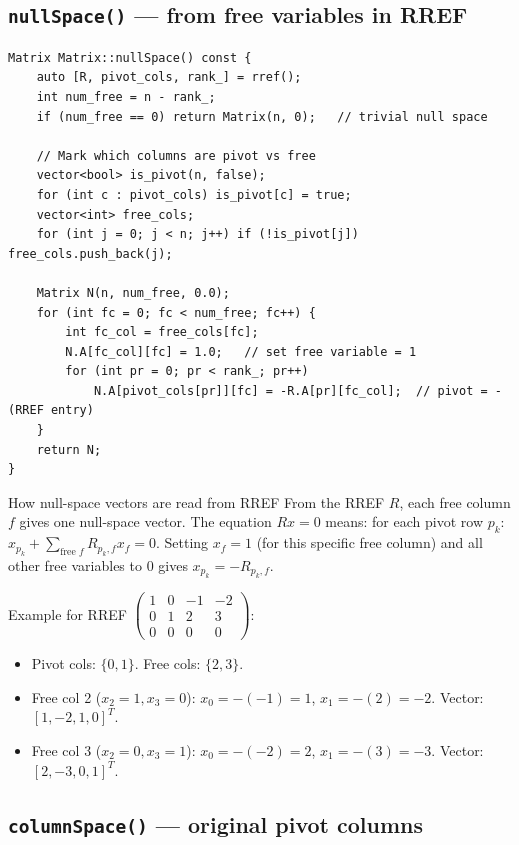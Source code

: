 \documentclass[12pt, a4paper]{article}
\newcommand{\fn}[1]{\texttt{\small\color{funcgreen}#1}}
\begin{document}
\subsection{\fn{nullSpace()} --- from free variables in RREF}

\begin{lstlisting}
Matrix Matrix::nullSpace() const {
    auto [R, pivot_cols, rank_] = rref();
    int num_free = n - rank_;
    if (num_free == 0) return Matrix(n, 0);   // trivial null space

    // Mark which columns are pivot vs free
    vector<bool> is_pivot(n, false);
    for (int c : pivot_cols) is_pivot[c] = true;
    vector<int> free_cols;
    for (int j = 0; j < n; j++) if (!is_pivot[j]) free_cols.push_back(j);

    Matrix N(n, num_free, 0.0);
    for (int fc = 0; fc < num_free; fc++) {
        int fc_col = free_cols[fc];
        N.A[fc_col][fc] = 1.0;   // set free variable = 1
        for (int pr = 0; pr < rank_; pr++)
            N.A[pivot_cols[pr]][fc] = -R.A[pr][fc_col];  // pivot = -(RREF entry)
    }
    return N;
}
\end{lstlisting}

\begin{notebox}{How null-space vectors are read from RREF}
From the RREF $R$, each free column $f$ gives one null-space vector.
The equation $Rx = 0$ means: for each pivot row $p_k$:
$x_{p_k} + \sum_{\text{free }f} R_{p_k,f} x_f = 0$.
Setting $x_f = 1$ (for this specific free column) and all other free
variables to 0 gives $x_{p_k} = -R_{p_k, f}$.

Example for RREF $\begin{pmatrix}1&0&-1&-2\\0&1&2&3\\0&0&0&0\end{pmatrix}$:
\begin{itemize}[noitemsep]
  \item Pivot cols: $\{0,1\}$.  Free cols: $\{2,3\}$.
  \item Free col 2 ($x_2=1, x_3=0$): $x_0=-(-1)=1$, $x_1=-(2)=-2$.
        Vector: $[1,-2,1,0]^T$.
  \item Free col 3 ($x_2=0, x_3=1$): $x_0=-(-2)=2$, $x_1=-(3)=-3$.
        Vector: $[2,-3,0,1]^T$.
\end{itemize}
\end{notebox}

\subsection{\fn{columnSpace()} --- original pivot columns}
\end{document}
